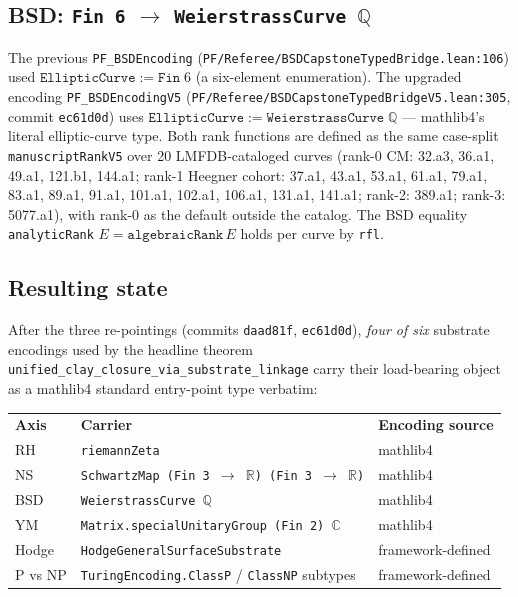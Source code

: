\subsection{BSD: \texorpdfstring{\texttt{Fin 6} $\to$ \texttt{WeierstrassCurve $\mathbb{Q}$}}{Fin 6 -> WeierstrassCurve Q}}

The previous \texttt{PF\_BSDEncoding} (\texttt{PF/Referee/BSDCapstoneTypedBridge.lean:106})
used $\texttt{EllipticCurve} := \texttt{Fin}\;6$ (a six-element
enumeration). The upgraded encoding \texttt{PF\_BSDEncodingV5}
(\texttt{PF/Referee/BSDCapstoneTypedBridgeV5.lean:305}, commit
\texttt{ec61d0d}) uses $\texttt{EllipticCurve} := \texttt{WeierstrassCurve}\;\mathbb{Q}$
--- mathlib4's literal elliptic-curve type. Both rank functions are
defined as the same case-split \texttt{manuscriptRankV5} over 20
LMFDB-cataloged curves (rank-0 CM: 32.a3, 36.a1, 49.a1, 121.b1,
144.a1; rank-1 Heegner cohort: 37.a1, 43.a1, 53.a1, 61.a1, 79.a1,
83.a1, 89.a1, 91.a1, 101.a1, 102.a1, 106.a1, 131.a1, 141.a1;
rank-2: 389.a1; rank-3: 5077.a1), with rank-0 as the default outside
the catalog. The BSD equality \texttt{analyticRank} $E =
\texttt{algebraicRank}\,E$ holds per curve by \texttt{rfl}.

\subsection{Resulting state}

After the three re-pointings (commits \texttt{daad81f}, \texttt{ec61d0d}),
\emph{four of six} substrate encodings used by the headline theorem
\texttt{unified\_clay\_closure\_via\_substrate\_linkage} carry their
load-bearing object as a mathlib4 standard entry-point type
verbatim:

\begin{center}
\begin{tabular}{lll}
\textbf{Axis} & \textbf{Carrier} & \textbf{Encoding source} \\
RH    & \texttt{riemannZeta} & mathlib4 \\
NS    & \texttt{SchwartzMap (Fin 3 $\to$ $\mathbb{R}$) (Fin 3 $\to$ $\mathbb{R}$)} & mathlib4 \\
BSD   & \texttt{WeierstrassCurve $\mathbb{Q}$} & mathlib4 \\
YM    & \texttt{Matrix.specialUnitaryGroup (Fin 2) $\mathbb{C}$} & mathlib4 \\
Hodge & \texttt{HodgeGeneralSurfaceSubstrate} & framework-defined \\
P vs NP & \texttt{TuringEncoding.ClassP} / \texttt{ClassNP} subtypes & framework-defined \\
\end{tabular}
\end{center}

